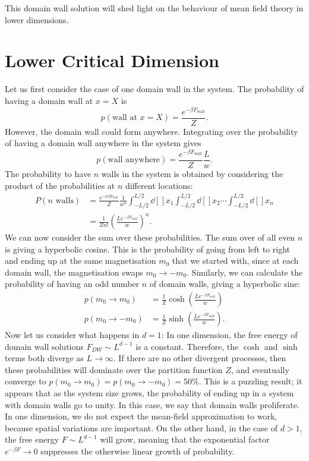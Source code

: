 This domain wall solution will shed light on the behaviour of mean field theory in lower dimensions.

\section{Lower Critical Dimension}%
\label{sec:lower_critical_dimension}

Let us first consider the case of one domain wall in the system.
The probability of having a domain wall at $x = X$ is
\begin{equation}
  p(\text{wall at }x = X) = \frac{e^{-\beta F_{\text{wall}}}}{Z}.
\end{equation}
However, the domain wall could form anywhere. Integrating over the probability of having a domain wall anywhere in the system gives
\begin{equation}
p(\text{wall anywhere}) = \frac{e^{-\beta F_{\text{wall}}}}{Z} \frac{L}{w}.
\end{equation}
The probability to have $n$ walls in the system is obtained by considering the product of the probabilities at $n$ different locations:
\begin{align}
  P(n \text{ walls}) &= \frac{e^{-n\beta F_{\text{wall}}}}{Z} \frac{1}{w^n} \int_{-L/2}^{L/2} \dd[]{x_1}\int_{-L/2}^{L/2} \dd[]{x_2} \cdots \int_{-L/2}^{L/2} \dd[]{x_n} \\
		     &= \frac{1}{Z n!} \left( \frac{L e^{-\beta F_{\text{wall}}}}{w} \right)^n.
\end{align}
We can now consider the sum over these probabilities. The sum over of all even $n$ is giving a hyperbolic cosine. This is the probability of going from left to right and ending up at the same magnetisation $m_0$ that we started with, since at each domain wall, the magnetisation swaps $m_0 \to -m_0$. Similarly, we can calculate the probability of having an odd number $n$ of domain walls, giving a hyperbolic sine:
\begin{align}
  p(m_0 \to m_0) &= \frac{1}{Z} \cosh \left( \frac{L e^{-\beta F_{\text{wall}}}}{w} \right)\\
  p(m_0 \to -m_0) &= \frac{1}{Z} \sinh \left( \frac{L e^{-\beta F_{\text{wall}}}}{w} \right).
\end{align}
Now let us consider what happens in $d = 1$: In one dimension, the free energy of domain wall solutions $F_{DW} \sim L^{d-1}$ is a constant. Therefore, the $\cosh$ and $\sinh$ terms both diverge as $L \to \infty$. If there are no other divergent processes, then these probabilities will dominate over the partition function $Z$, and eventually converge to $p(m_0 \to m_0) = p(m_0 \to -m_0) = 50\%$.
This is a puzzling result; it appears that as the system size grows, the probability of ending up in a system with domain walls go to unity. In this case, we say that domain walls proliferate.
In one dimension, we do not expect the mean-field approximation to work, because spatial variations are important.
On the other hand, in the case of $d > 1$, the free energy $F \sim L^{d-1}$ will grow, meaning that the exponential factor $e^{-\beta F} \to 0$ suppresses the otherwise linear growth of probability.

